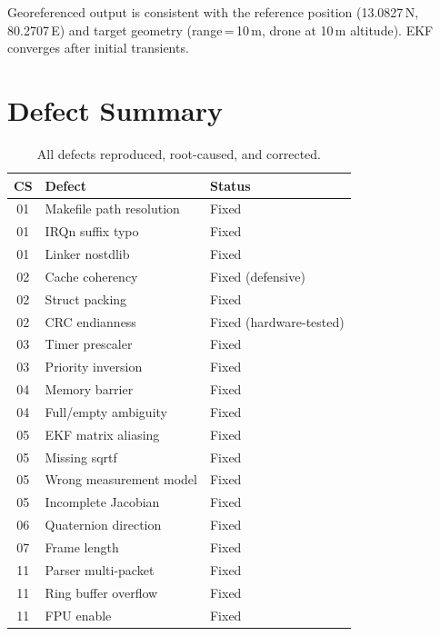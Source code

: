 Georeferenced output is consistent with the reference position (13.0827\,N, 80.2707\,E) and target geometry (range\,=\,10\,m, drone at 10\,m altitude). EKF converges after initial transients.

\section{Defect Summary}

\begin{table}[htbp]
\centering
\caption{All defects reproduced, root-caused, and corrected.}
\label{tab:E:defects}
\begin{tabular}{@{}cll@{}}
\toprule
\textbf{CS} & \textbf{Defect} & \textbf{Status} \\
\midrule
01 & Makefile path resolution & Fixed \\
01 & IRQn suffix typo & Fixed \\
01 & Linker nostdlib & Fixed \\
02 & Cache coherency & Fixed (defensive) \\
02 & Struct packing & Fixed \\
02 & CRC endianness & Fixed (hardware-tested) \\
03 & Timer prescaler & Fixed \\
03 & Priority inversion & Fixed \\
04 & Memory barrier & Fixed \\
04 & Full/empty ambiguity & Fixed \\
05 & EKF matrix aliasing & Fixed \\
05 & Missing sqrtf & Fixed \\
05 & Wrong measurement model & Fixed \\
05 & Incomplete Jacobian & Fixed \\
06 & Quaternion direction & Fixed \\
07 & Frame length & Fixed \\
11 & Parser multi-packet & Fixed \\
11 & Ring buffer overflow & Fixed \\
11 & FPU enable & Fixed \\
\bottomrule
\end{tabular}
\end{table}